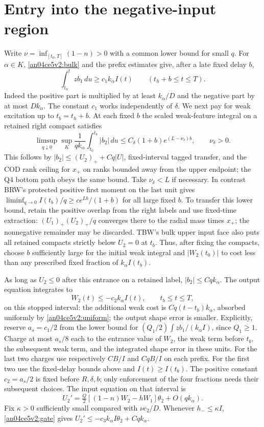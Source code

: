 \documentclass[11pt]{article}
\begin{document}
\section{Entry into the negative-input region}\label{an04ce5v2:entry}
Write $\nu=\inf_{[t_0,T]}(1-n)>0$ with a common lower bound for small
$q$. For $\alpha\in K$, \eqref{an04ce5v2:bulk} and the prefix estimates give,
after a late fixed delay $b$,
\[
 \int_{t_0}^t z b_1\,du\ge c_1 k_\alpha I(t)
 \qquad(t_h+b\le t\le T).
\]
Indeed the positive part is multiplied by at least $k_\alpha/D$ and
the negative part by at most $D k_\alpha$. The constant $c_1$ works
independently of $\delta$. We next pay for weak excitation up to
$t_b=t_h+b$. At each fixed $b$ the scaled weak-feature integral on a
retained right compact satisfies
\[
 \limsup_{q\downarrow0}\sup_K
 \frac{1}{q k_\alpha}\int_{t_0}^{t_b}|b_2|\,du
 \le C_\delta(1+b)e^{(L-\nu_\delta)b},\qquad \nu_\delta>0.
\]
This follows by $|b_2|\le (U_2)_++Cq|U|$, fixed-interval tagged
transfer, and the COD rank ceiling for $x_+$ on ranks bounded away from
the upper endpoint; the Q4 bottom path obeys the same bound. Take
$\nu_\delta<L$ if necessary. In contrast BRW's protected positive
first moment on the last unit gives
$\liminf_{q\to0} I(t_b)/q\ge c e^{Lb}/(1+b)$ for all large fixed $b$.
To transfer this lower bound, retain the positive overlap from the
right labels and use fixed-time extraction:
$(U_1)_+(U_2)_+/q$ converges there to the radial mass times $x_+$;
the nonnegative remainder may be discarded. TBW's bulk upper input
face also puts all retained compacts strictly below $U_2=0$ at $t_b$.
Thus, after fixing the compacts, choose $b$ sufficiently large for
the initial weak integral and $|W_2(t_0)|$ to cost less than any
prescribed fixed fraction of $k_\alpha I(t_b)$.

As long as $U_2\le0$ after this entrance on a retained label,
$|b_2|\le Cq k_\alpha$. The output equation integrates to
\begin{equation}
 W_2(t)\le -c_2 k_\alpha I(t),\qquad t_b\le t\le T,
 \label{an04ce5v2:wnegative}
\end{equation}
on this stopped interval: the additional weak cost is $Cq(t-t_b)k_\alpha$,
absorbed uniformly by \eqref{an04ce5v2:uniform}; the output shape error is
smaller. Explicitly, reserve $a_s=c_1/2$ from the lower bound for $(Q_1/2)\int z b_1/(k_\alpha I)$, since $Q_1\ge1$. Charge at most $a_s/8$ each to the entrance value of $W_2$, the weak term before $t_b$, the subsequent weak term, and the integrated shape error in these units. For the last two charges use respectively $CB/I$ and $CqB/I$ on each prefix. For the first two use the fixed-delay bounds above and $I(t)\ge I(t_b)$. The positive constant $c_2=a_s/2$ is fixed before $R,\delta,b$; only enforcement of the four fractions needs their subsequent choices. The input equation on that interval is
\begin{equation}
 U_2'=\tfrac Q2[(1-n)W_2-hW_1]\theta_2+O(qk_\alpha).
 \label{an04ce5v2:gate}
\end{equation}
Fix $\kappa>0$ sufficiently small compared with $\nu c_2/D$.
Whenever $h_-\le\kappa I$, \eqref{an04ce5v2:gate} gives
$U_2'\le-c_3 k_\alpha I\theta_2+Cq k_\alpha$.
\end{document}
